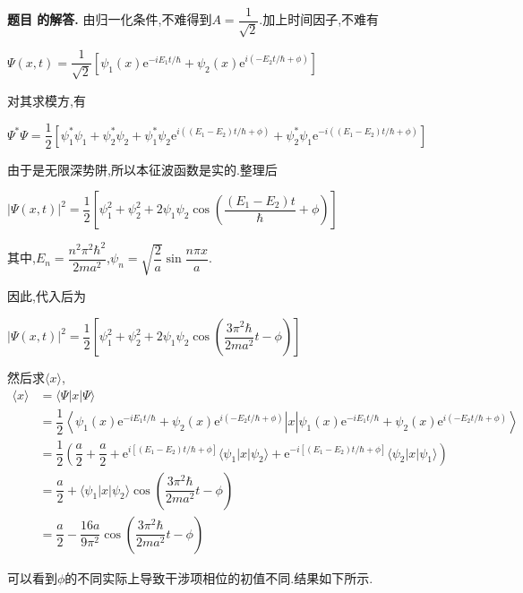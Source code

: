 \documentclass[12pt, a4paper, oneside]{ctexart}
\newcounter{problemname}
\newenvironment{solution}
  {\par\noindent\textbf{题目 \theproblemname 的解答. }}
  {\par}
\begin{document}
\begin{solution}
  由归一化条件,不难得到$A = \dfrac{1}{\sqrt{2}}$.加上时间因子,不难有

  \centerline{$\Psi(x,t) = \dfrac{1}{\sqrt{2}} [\psi_1(x)\mathrm{e}^{-iE_1t/\hbar} + \psi_2(x)\mathrm{e}^{i(-E_2t/\hbar+\phi)}]$}

  对其求模方,有

  \centerline{$\Psi^* \Psi = \dfrac{1}{2} \left[\psi_1^* \psi_1 + \psi_2^*\psi_2 + \psi_1^*\psi_2 \mathrm{e}^{i((E_1 - E_2)t/\hbar+\phi)} + \psi_2^*\psi_1 \mathrm{e}^{-i((E_1-E_2)t/\hbar + \phi)}\right]$}

  由于是无限深势阱,所以本征波函数是实的.整理后

  \centerline{$|\Psi(x,t)|^2 = \dfrac{1}{2}\left[\psi_1^2 + \psi_2^2 + 2\psi_1\psi_2 \cos\left(\dfrac{(E_1 - E_2)t}{\hbar}+\phi\right)\right]$}

  其中,$E_n = \dfrac{n^2\pi^2\hbar^2}{2ma^2}$,$\psi_n = \sqrt{\dfrac{2}{a}}\sin\dfrac{n\pi x}{a}$.

  因此,代入后为

  \centerline{$|\Psi(x,t)|^2 = \dfrac{1}{2}\left[\psi_1^2 + \psi_2^2 + 2\psi_1\psi_2 \cos\left(\dfrac{3\pi^2\hbar}{2ma^2}t-\phi\right)\right]$}

  然后求$\langle x \rangle$,
  \begin{align*}
    \langle x \rangle &= \langle \Psi| x | \Psi \rangle\\
    &= \dfrac{1}{2} \left\langle \left.\psi_1(x)\mathrm{e}^{-iE_1t/\hbar} + \psi_2(x)\mathrm{e}^{i(-E_2t/\hbar+\phi)}\right. \right| x \left| \left.\psi_1(x)\mathrm{e}^{-iE_1t/\hbar} + \psi_2(x)\mathrm{e}^{i(-E_2t/\hbar+\phi)} \right. \right\rangle \\
    &= \dfrac{1}{2} \left( \dfrac{a}{2} + \dfrac{a}{2} + \mathrm{e}^{i[(E_1 - E_2)t/\hbar + \phi]} \langle \psi_1 | x | \psi_2 \rangle + \mathrm{e}^{-i[(E_1 - E_2)t/\hbar+\phi]} \langle \psi_2 | x | \psi_1 \rangle\right) \\
    &= \dfrac{a}{2} + \langle \psi_1 | x | \psi_2 \rangle \cos\left( \dfrac{3\pi^2\hbar}{2ma^2}t-\phi\right) \\ 
    &= \dfrac{a}{2} - \dfrac{16a}{9\pi^2}\cos\left( \dfrac{3\pi^2\hbar}{2ma^2}t-\phi\right) 
  \end{align*}

  可以看到$\phi$的不同实际上导致干涉项相位的初值不同.结果如下所示.


\end{solution}
\end{document}

